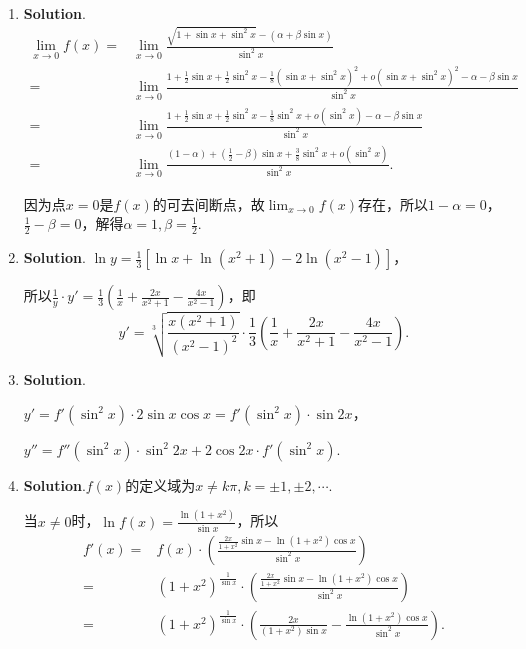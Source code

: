 \documentclass[../Main.tex]{subfiles}
\begin{document}
\begin{enumerate}
    \item \textbf{Solution}.
          \[
              \begin{aligned}
                  \lim_{x\to0}f(x)= & \lim_{x\to0}\frac{\sqrt{1+\sin x+\sin^2 x}-(\alpha+\beta\sin x)}{\sin^2 x}                                                                  \\
                  =                 & \lim_{x\to0}\frac{1+\frac{1}{2}\sin x+\frac{1}{2}\sin^2 x-\frac{1}{8}(\sin x+\sin^2 x)^2+o(\sin x+\sin^2 x)^2-\alpha-\beta\sin x}{\sin^2 x} \\
                  =                 & \lim_{x\to0}\frac{1+\frac{1}{2}\sin x+\frac{1}{2}\sin^2 x-\frac{1}{8}\sin^2 x+o(\sin^2 x)-\alpha-\beta\sin x}{\sin^2 x}                     \\
                  =                 & \lim_{x\to0}\frac{(1-\alpha)+(\frac{1}{2}-\beta)\sin x+\frac{3}{8}\sin^2 x+o(\sin^2 x)}{\sin^2 x}.
              \end{aligned}
          \]

          因为点$x=0$是$f(x)$的可去间断点，故$\lim_{x\to0}f(x)$存在，所以$1-\alpha=0$，$\frac{1}{2}
              -\beta=0$，解得$\alpha=1,\beta=\frac{1}{2}$.

    \item \textbf{Solution}. $\ln y=\frac{1}{3}\left[\ln x+\ln(x^{2}+1)-2\ln(x^{2}
                  -1)\right]$，

          所以$\frac{1}{y}\cdot y'=\frac{1}{3}\left(\frac{1}{x}+\frac{2x}{x^{2}+1}-\frac{4x}{x^{2}-1}
              \right)$，即
          \[
              y'=\sqrt[3]{\frac{x(x^{2}+1)}{(x^{2}-1)^{2}}}\cdot\frac{1}{3}\left(\frac{1}{x}
              +\frac{2x}{x^{2}+1}-\frac{4x}{x^{2}-1}\right).
          \]

    \item \textbf{Solution}.

          $y'=f'(\sin^{2}x)\cdot2\sin x\cos x=f'(\sin^{2}x)\cdot\sin 2x$，

          $y''=f''(\sin^{2}x)\cdot\sin^{2}2x+2\cos 2x\cdot f'(\sin^{2}x)$.

    \item \textbf{Solution}.$f(x)$的定义域为$x\neq k\pi,k=\pm1, \pm2,\cdots$.

          当$x\neq0$时，$\ln f(x)=\frac{\ln(1+x^{2})}{\sin x}$，所以
          \[
              \begin{aligned}
                  f'(x)= & f(x)\cdot\left(\frac{\frac{2x}{1+x^2}\sin x-\ln(1+x^2)\cos x}{\sin^2 x}\right)                            \\
                  =      & (1+x^{2})^{\frac{1}{\sin x}}\cdot\left(\frac{\frac{2x}{1+x^2}\sin x-\ln(1+x^2)\cos x}{\sin^2 x}\right)    \\
                  =      & (1+x^{2})^{\frac{1}{\sin x}}\cdot\left(\frac{2x}{(1+x^2)\sin x}-\frac{\ln(1+x^2)\cos x}{\sin^2 x}\right).
              \end{aligned}
          \]


\end{enumerate}
\end{document}
